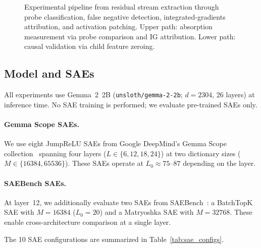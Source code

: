 \documentclass{article}
\begin{document}
\begin{figure}[t]
{
}
\caption{Experimental pipeline from residual stream extraction through probe classification, false negative detection, integrated-gradients attribution, and activation patching. Upper path: absorption measurement via probe comparison and IG attribution. Lower path: causal validation via child feature zeroing.}
\label{fig:pipeline}
\end{figure}

\subsection{Model and SAEs}
\label{sec:model}

All experiments use Gemma~2~2B (\texttt{unsloth/gemma-2-2b}; $d = 2304$, 26 layers) at inference time. No SAE training is performed; we evaluate pre-trained SAEs only.

\paragraph{Gemma Scope SAEs.} We use eight JumpReLU SAEs from Google DeepMind's Gemma Scope collection~\citep{lieberum2024gemma} spanning four layers ($L \in \{6, 12, 18, 24\}$) at two dictionary sizes ($M \in \{16384, 65536\}$). These SAEs operate at $L_0 \approx 75$--$87$ depending on the layer.

\paragraph{SAEBench SAEs.} At layer~12, we additionally evaluate two SAEs from SAEBench~\citep{karvonen2025saebench}: a BatchTopK SAE with $M = 16384$ ($L_0 = 20$) and a Matryoshka SAE with $M = 32768$. These enable cross-architecture comparison at a single layer.

The 10 SAE configurations are summarized in Table~\ref{tab:sae_configs}.
\end{document}
